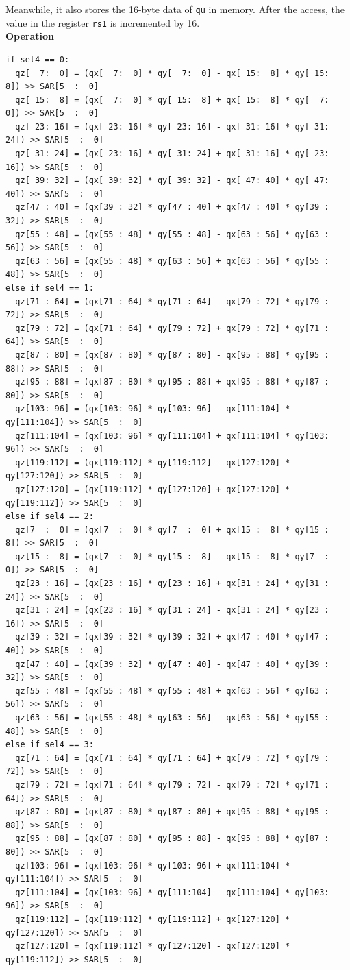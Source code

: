 Meanwhile, it also stores the 16-byte data of \lstinline{qu} in memory. After the access, the value in the register \lstinline{rs1} is incremented by 16.\\
\textbf{Operation}\\
\begin{lstlisting}
if sel4 == 0:
  qz[  7:  0] = (qx[  7:  0] * qy[  7:  0] - qx[ 15:  8] * qy[ 15:  8]) >> SAR[5  :  0]
  qz[ 15:  8] = (qx[  7:  0] * qy[ 15:  8] + qx[ 15:  8] * qy[  7:  0]) >> SAR[5  :  0]
  qz[ 23: 16] = (qx[ 23: 16] * qy[ 23: 16] - qx[ 31: 16] * qy[ 31: 24]) >> SAR[5  :  0]
  qz[ 31: 24] = (qx[ 23: 16] * qy[ 31: 24] + qx[ 31: 16] * qy[ 23: 16]) >> SAR[5  :  0]
  qz[ 39: 32] = (qx[ 39: 32] * qy[ 39: 32] - qx[ 47: 40] * qy[ 47: 40]) >> SAR[5  :  0]
  qz[47 : 40] = (qx[39 : 32] * qy[47 : 40] + qx[47 : 40] * qy[39 : 32]) >> SAR[5  :  0]
  qz[55 : 48] = (qx[55 : 48] * qy[55 : 48] - qx[63 : 56] * qy[63 : 56]) >> SAR[5  :  0]
  qz[63 : 56] = (qx[55 : 48] * qy[63 : 56] + qx[63 : 56] * qy[55 : 48]) >> SAR[5  :  0]
else if sel4 == 1:
  qz[71 : 64] = (qx[71 : 64] * qy[71 : 64] - qx[79 : 72] * qy[79 : 72]) >> SAR[5  :  0]
  qz[79 : 72] = (qx[71 : 64] * qy[79 : 72] + qx[79 : 72] * qy[71 : 64]) >> SAR[5  :  0]
  qz[87 : 80] = (qx[87 : 80] * qy[87 : 80] - qx[95 : 88] * qy[95 : 88]) >> SAR[5  :  0]
  qz[95 : 88] = (qx[87 : 80] * qy[95 : 88] + qx[95 : 88] * qy[87 : 80]) >> SAR[5  :  0]
  qz[103: 96] = (qx[103: 96] * qy[103: 96] - qx[111:104] * qy[111:104]) >> SAR[5  :  0]
  qz[111:104] = (qx[103: 96] * qy[111:104] + qx[111:104] * qy[103: 96]) >> SAR[5  :  0]
  qz[119:112] = (qx[119:112] * qy[119:112] - qx[127:120] * qy[127:120]) >> SAR[5  :  0]
  qz[127:120] = (qx[119:112] * qy[127:120] + qx[127:120] * qy[119:112]) >> SAR[5  :  0]
else if sel4 == 2:
  qz[7  :  0] = (qx[7  :  0] * qy[7  :  0] + qx[15 :  8] * qy[15 :  8]) >> SAR[5  :  0]
  qz[15 :  8] = (qx[7  :  0] * qy[15 :  8] - qx[15 :  8] * qy[7  :  0]) >> SAR[5  :  0]
  qz[23 : 16] = (qx[23 : 16] * qy[23 : 16] + qx[31 : 24] * qy[31 : 24]) >> SAR[5  :  0]
  qz[31 : 24] = (qx[23 : 16] * qy[31 : 24] - qx[31 : 24] * qy[23 : 16]) >> SAR[5  :  0]
  qz[39 : 32] = (qx[39 : 32] * qy[39 : 32] + qx[47 : 40] * qy[47 : 40]) >> SAR[5  :  0]
  qz[47 : 40] = (qx[39 : 32] * qy[47 : 40] - qx[47 : 40] * qy[39 : 32]) >> SAR[5  :  0]
  qz[55 : 48] = (qx[55 : 48] * qy[55 : 48] + qx[63 : 56] * qy[63 : 56]) >> SAR[5  :  0]
  qz[63 : 56] = (qx[55 : 48] * qy[63 : 56] - qx[63 : 56] * qy[55 : 48]) >> SAR[5  :  0]
else if sel4 == 3:
  qz[71 : 64] = (qx[71 : 64] * qy[71 : 64] + qx[79 : 72] * qy[79 : 72]) >> SAR[5  :  0]
  qz[79 : 72] = (qx[71 : 64] * qy[79 : 72] - qx[79 : 72] * qy[71 : 64]) >> SAR[5  :  0]
  qz[87 : 80] = (qx[87 : 80] * qy[87 : 80] + qx[95 : 88] * qy[95 : 88]) >> SAR[5  :  0]
  qz[95 : 88] = (qx[87 : 80] * qy[95 : 88] - qx[95 : 88] * qy[87 : 80]) >> SAR[5  :  0]
  qz[103: 96] = (qx[103: 96] * qy[103: 96] + qx[111:104] * qy[111:104]) >> SAR[5  :  0]
  qz[111:104] = (qx[103: 96] * qy[111:104] - qx[111:104] * qy[103: 96]) >> SAR[5  :  0]
  qz[119:112] = (qx[119:112] * qy[119:112] + qx[127:120] * qy[127:120]) >> SAR[5  :  0]
  qz[127:120] = (qx[119:112] * qy[127:120] - qx[127:120] * qy[119:112]) >> SAR[5  :  0]


\end{lstlisting}
